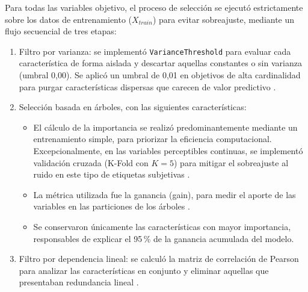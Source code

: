 Para todas las variables objetivo, el proceso de selección se ejecutó estrictamente sobre los datos de entrenamiento ($X_{train}$) para evitar sobreajuste, mediante un flujo secuencial de tres etapas:

\begin{enumerate}
    \item Filtro por varianza: se implementó \texttt{VarianceThreshold} \citep{scikit-learn} para evaluar cada característica de forma aislada y descartar aquellas constantes o sin varianza (umbral 0,00). Se aplicó un umbral de 0,01 en objetivos de alta cardinalidad para purgar características dispersas que carecen de valor predictivo \citep{kuhn2013applied}.
    \item Selección basada en árboles, con las siguientes características:
    \begin{itemize}
        \item El cálculo de la importancia se realizó predominantemente mediante un entrenamiento simple, para priorizar la eficiencia computacional. Excepcionalmente, en las variables perceptibles continuas, se implementó validación cruzada (K-Fold con $K=5$) para mitigar el sobreajuste al ruido en este tipo de etiquetas subjetivas \citep{kohavi1995study}.
        \item La métrica utilizada fue la ganancia (gain), para medir el aporte de las variables en las particiones de los árboles \citep{breiman1984classification, ke2017lightgbm}.
        \item Se conservaron únicamente las características con mayor importancia, responsables de explicar el 95\,\% de la ganancia acumulada del modelo.
    \end{itemize}
    \item Filtro por dependencia lineal: se calculó la matriz de correlación de Pearson para analizar las características en conjunto y eliminar aquellas que presentaban redundancia lineal \citep{guyon2003introduction, kuhn2013applied}.
\end{enumerate}

